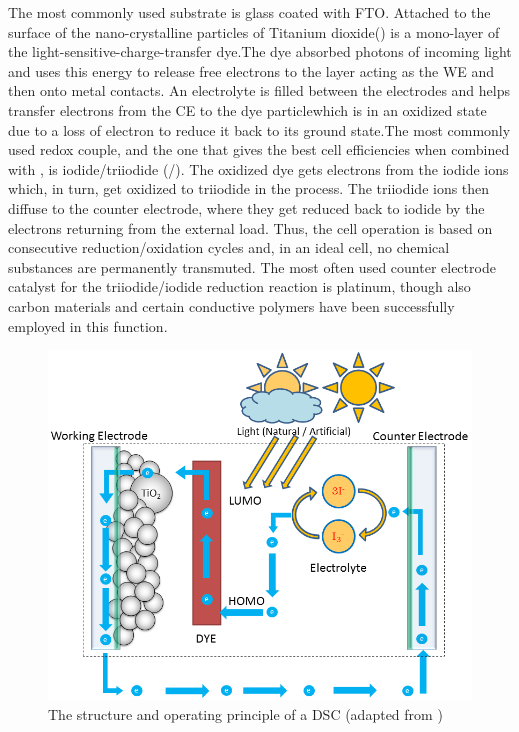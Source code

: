 The most commonly used substrate is glass coated with \ac{FTO}. Attached to the surface of the nano-crystalline particles of Titanium dioxide() is a mono-layer of the light-sensitive-charge-transfer dye.The dye absorbed photons of incoming light and uses this energy to release free electrons to the  layer acting as the \ac{WE} and then onto metal contacts. An electrolyte is filled between the electrodes and helps transfer electrons from the \ac{CE} to the dye particle{which is in an oxidized state due to a loss of electron} to reduce it back to its ground state.The most commonly used redox couple, and the one that gives the best cell efficiencies when combined with , is iodide/triiodide (/). The oxidized dye gets electrons from the iodide ions which, in turn, get oxidized to triiodide in the process. The triiodide ions then diffuse to the counter electrode, where they get reduced back to iodide by the electrons returning from the external load. Thus, the cell operation is based on consecutive reduction/oxidation cycles and, in an ideal cell, no chemical substances are permanently transmuted. The most often used counter electrode catalyst for the triiodide/iodide reduction reaction is platinum, though also carbon materials and certain conductive polymers have been successfully employed in this function.\\
\begin{figure}[H]
\begin{center}
\includegraphics[width=\textwidth]{images/Cell_Cycle}
\caption{ The structure and operating principle of a DSC (adapted from \cite{toivola2010dye,}\cite{gcell_DSSC_cycle})}
\label{fig:Cell_Cycle}
\end{center}
\end{figure}

